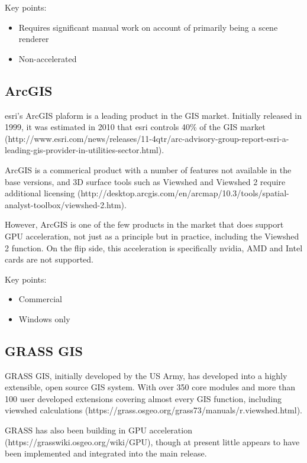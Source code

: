 \documentclass[a4paper]{article}
\begin{document}
        Key points:
        \begin{itemize}
            \item Requires significant manual work on account of primarily being a scene renderer
            \item Non-accelerated
        \end{itemize}

        \subsection{ArcGIS}
        esri's ArcGIS plaform is a leading product in the GIS market. Initially released in 1999, it was estimated in
        2010 that esri controls 40\% of the GIS market
        (http://www.esri.com/news/releases/11-4qtr/arc-advisory-group-report-esri-a-leading-gis-provider-in-utilities-sector.html).

        ArcGIS is a commerical product with a number of features not available in the base versions, and 3D surface
        tools such as Viewshed and Viewshed 2 require additional licensing
        (http://desktop.arcgis.com/en/arcmap/10.3/tools/spatial-analyst-toolbox/viewshed-2.htm).

        However, ArcGIS is one of the few products in the market that does support GPU acceleration, not just as a
        principle but in practice, including the Viewshed 2 function. On the flip side, this acceleration is
        specifically nvidia, AMD and Intel cards are not supported.

        Key points:
        \begin{itemize}
            \item Commercial
            \item Windows only
        \end{itemize}

        \subsection{GRASS GIS}
        GRASS GIS, initially developed by the US Army, has developed into a highly extensible, open source GIS system.
        With over 350 core modules and more than 100 user developed extensions covering almost every GIS function,
        including viewshed calculations (https://grass.osgeo.org/grass73/manuals/r.viewshed.html).

        GRASS has also been building in GPU acceleration (https://grasswiki.osgeo.org/wiki/GPU), though at present
        little appears to have been implemented and integrated into the main release.
\end{document}
